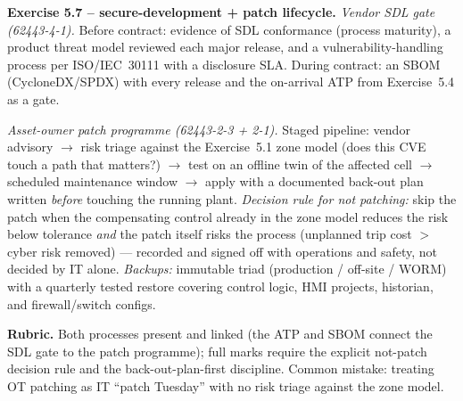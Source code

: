 \documentclass[11pt,a4paper]{article}
\begin{document}
\begin{solutionbox}
\textbf{Exercise 5.7 -- secure-development + patch lifecycle.}
\emph{Vendor SDL gate (62443-4-1).} Before contract: evidence of SDL conformance (process maturity), a product threat model reviewed each major release, and a vulnerability-handling process per ISO/IEC~30111 with a disclosure SLA. During contract: an SBOM (CycloneDX/SPDX) with every release and the on-arrival ATP from Exercise~5.4 as a gate.
\par\vspace{2mm}
\emph{Asset-owner patch programme (62443-2-3 + 2-1).} Staged pipeline: vendor advisory $\to$ risk triage against the Exercise~5.1 zone model (does this CVE touch a path that matters?) $\to$ test on an offline twin of the affected cell $\to$ scheduled maintenance window $\to$ apply with a documented back-out plan written \emph{before} touching the running plant. \emph{Decision rule for not patching:} skip the patch when the compensating control already in the zone model reduces the risk below tolerance \emph{and} the patch itself risks the process (unplanned trip cost $>$ cyber risk removed) --- recorded and signed off with operations and safety, not decided by IT alone. \emph{Backups:} immutable triad (production / off-site / WORM) with a quarterly tested restore covering control logic, HMI projects, historian, and firewall/switch configs.
\par\vspace{2mm}
\textbf{Rubric.} Both processes present and linked (the ATP and SBOM connect the SDL gate to the patch programme); full marks require the explicit not-patch decision rule and the back-out-plan-first discipline. Common mistake: treating OT patching as IT ``patch Tuesday'' with no risk triage against the zone model.
\end{solutionbox}
\end{document}
